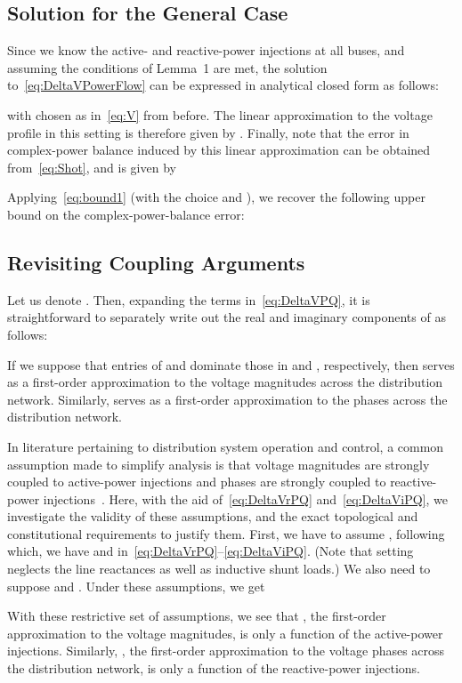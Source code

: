 \documentclass[10 pt, conference]{ieeeconf}
\begin{document}
\subsection{Solution for the General Case}
Since we know the active- and reactive-power injections at all buses, and assuming the conditions of Lemma~1 are met, the solution to~\eqref{eq:DeltaVPowerFlow} can be expressed in analytical closed form as follows:

with  chosen as in~\eqref{eq:V} from before. The linear approximation to the voltage profile in this setting is therefore given by . Finally, note that the error in complex-power balance induced by this linear approximation can be obtained from~\eqref{eq:Shot}, and is given by

Applying~\eqref{eq:bound1} (with the choice  and ), we recover the following upper bound on the complex-power-balance error:


\subsection{Revisiting Coupling Arguments}
Let us denote . Then, expanding the terms in~\eqref{eq:DeltaVPQ}, it is straightforward to separately write out the real and imaginary components of  as follows: 


If we suppose that entries of  and  dominate those in  and , respectively, then  serves as a first-order approximation to the voltage magnitudes  across the distribution network. Similarly,  serves as a first-order approximation to the phases  across the distribution network.

In literature pertaining to distribution system operation and control, a common assumption made to simplify analysis is that voltage magnitudes are strongly coupled to active-power injections and phases are strongly coupled to reactive-power injections~\cite{Robbins-2013,Zhong-2013,Emiliano-2015}. Here, with the aid of~\eqref{eq:DeltaVrPQ} and~\eqref{eq:DeltaViPQ}, we investigate the validity of these assumptions, and the exact topological and constitutional requirements to justify them. First, we have to assume , following which, we have  and  in~\eqref{eq:DeltaVrPQ}--\eqref{eq:DeltaViPQ}. (Note that setting  neglects the line reactances as well as inductive shunt loads.) We also need to suppose  and . Under these assumptions, we get    

With these restrictive set of assumptions, we see that , the first-order approximation to the voltage magnitudes, is only a function of the active-power injections. Similarly, , the first-order approximation to the voltage phases across the distribution network, is only a function of the reactive-power injections.
\end{document}
